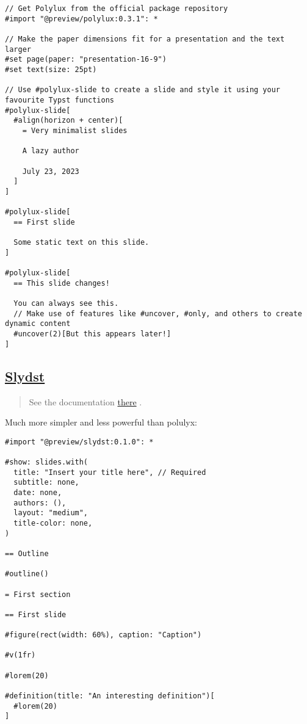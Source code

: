 \begin{verbatim}
// Get Polylux from the official package repository
#import "@preview/polylux:0.3.1": *

// Make the paper dimensions fit for a presentation and the text larger
#set page(paper: "presentation-16-9")
#set text(size: 25pt)

// Use #polylux-slide to create a slide and style it using your favourite Typst functions
#polylux-slide[
  #align(horizon + center)[
    = Very minimalist slides

    A lazy author

    July 23, 2023
  ]
]

#polylux-slide[
  == First slide

  Some static text on this slide.
]

#polylux-slide[
  == This slide changes!

  You can always see this.
  // Make use of features like #uncover, #only, and others to create dynamic content
  #uncover(2)[But this appears later!]
]
\end{verbatim}

\pandocbounded{}

\pandocbounded{}

\pandocbounded{}

\pandocbounded{}

\subsection{\texorpdfstring{\hyperref[slydst]{Slydst}}{Slydst}}\label{slydst}

\begin{quote}
See the documentation
\href{https://github.com/glambrechts/slydst?ysclid=lr2gszrkck541184604}{there}
.
\end{quote}

Much more simpler and less powerful than polulyx:

\begin{verbatim}
#import "@preview/slydst:0.1.0": *

#show: slides.with(
  title: "Insert your title here", // Required
  subtitle: none,
  date: none,
  authors: (),
  layout: "medium",
  title-color: none,
)

== Outline

#outline()

= First section

== First slide

#figure(rect(width: 60%), caption: "Caption")

#v(1fr)

#lorem(20)

#definition(title: "An interesting definition")[
  #lorem(20)
]
\end{verbatim}

